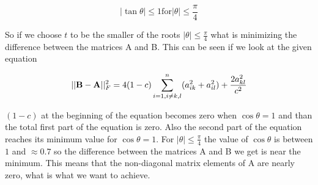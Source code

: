 \documentclass[11pt,a4wide]{article}
\begin{document}
\begin{equation}
\left|\tan{\theta}\right|\leq1 \text{for} \left|\theta\right|\leq\frac{\pi}{4}
\end{equation}

So if we choose $t$ to be the smaller of the roots $\left|\theta\right|\leq\frac{\pi}{4}$ what is minimizing the difference between the matrices A and B. This can be seen if we look at the given equation

\begin{equation}
||{\bf B}-{\bf A}||_F^2=4(1-c)\sum_{i=1,i\ne k,l}^n(a_{ik}^2+a_{il}^2) +\frac{2a_{kl}^2}{c^2}
\end{equation}

$(1-c)$ at the beginning of the equation becomes zero when $\cos{\theta}=1$ and than the total first part of the equation is zero. Also the second part of the equation reaches its minimum value for $\cos{\theta}=1$. For $\left|\theta\right|\leq\frac{\pi}{4}$ the value of $\cos{\theta}$ is between $1$ and $\approx 0.7$ so the difference between the matrices A and B we get is near the minimum. This means that the non-diagonal matrix elements of A are nearly zero, what is what we want to achieve.  

  
 
     
\end{document}

